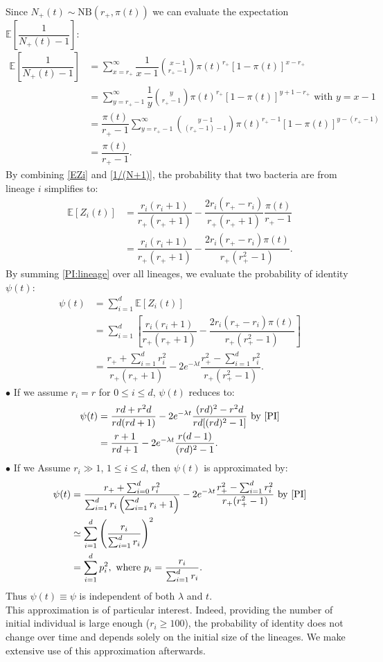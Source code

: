 \documentclass{article}
\begin{document}
Since $N_+(t) \sim \mathrm{NB} (r_+, \pi(t))$ we can evaluate the expectation $\mathbb{E}\left[\dfrac{1}{N_+(t)-1} \right]$:
\begin{align}
\mathbb{E}\left[\dfrac{1}{N_+(t)-1} \right] &= \sum_{x=r_+}^{\infty } \dfrac{1}{x-1} \binom{x-1}{r_+-1} \pi(t)^{r_+} [1-\pi(t)]^{x-r_+} \\
 &=\sum_{y=r_+-1}^{\infty} \dfrac{1}{y} \binom{y}{r_+-1} \pi(t)^{r_+} [1-\pi(t)]^{y+1-r_+} \text{ with }y=x-1\\
 &=\dfrac{\pi(t)}{r_+-1}\sum_{y=r_+-1}^{\infty}\binom{y-1}{(r_+-1)-1} \pi(t)^{r_+-1} [1-\pi(t)]^{y-(r_+-1)} \\ 
 &=\dfrac{\pi(t)}{r_+-1}.\label{1/(N+1)}
\end{align}
By combining \eqref{EZi} and \eqref{1/(N+1)}, the probability that two bacteria are from lineage $i$ simplifies to:
\begin{align}
\mathbb{E}\left[ Z_i(t) \right] &= \dfrac{r_i(r_i+1)}{r_+ (r_+ +1 )}-\dfrac{2 r_i (r_+ -r_{i})}{r_+ (r_+ +1 )}\dfrac{\pi(t)}{r_+-1}\\
 &=\dfrac{r_i(r_i+1)}{r_+ (r_+ +1 )}-\dfrac{2 r_i (r_+ -r_{i})\pi(t)}{r_+ (r_+^2 -1 )}. \label{PI:lineage}
\end{align}
By summing \eqref{PI:lineage} over all lineages, we evaluate the probability of identity $\psi(t)$:
\begin{align}
\psi(t) &= \displaystyle \sum_{i=1}^d \mathbb{E}\left[ Z_i(t) \right]\\
&= \displaystyle \sum_{i=1}^d \left[ \dfrac{r_i(r_i+1)}{r_+ (r_+ +1 )}-\dfrac{2 r_i (r_+ -r_{i})\pi(t)}{r_+ (r_+^2 -1 )} \right] \\
&=    \dfrac{ r_+ + \sum_{i=1}^d r_i^2}{r_+ (r_+ +1)}  -2 e^{-\lambda t} \dfrac{ r_+^2-\sum_{i=1}^d r_i^2}{r_+ (r_+^2 -1) }. \label{PI}
\end{align}
$\bullet$ If we assume $r_i=r$ for $0 \leq i \leq d$, $\psi(t)$ reduces to:
\begin{align}
\psi(t) &= \dfrac{ rd + r^2 d}{rd (rd +1)}  -2 e^{-\lambda t} \dfrac{ (rd)^2-r^2d}{rd [(rd)^2 -1] }  \text{ by } \eqref{PI} \\ 
 &= \dfrac{r+1}{rd+1}  -2e^{-\lambda t} \dfrac{r(d-1)}{(rd)^2 -1 }.
\end{align}
$\bullet$ If we Assume $r_i \gg 1$, $ 1 \leq i \leq d $, then $\psi(t)$ is approximated by:
 \begin{align}
\psi(t) &= \dfrac{ r_+ + \sum_{i=0}^d r_i^2}{\sum_{i=1}^d r_i \left(\sum_{i=1}^d r_i +1\right) }  -2 e^{-\lambda t} \dfrac{ r_+^2-\sum_{i=1}^d r_i^2}{r_+ (r_+^2 -1) } \text{ by } \eqref{PI} \\
 & \simeq \displaystyle \sum_{i=1}^d \left( \dfrac{ r_i}{\sum_{i=1}^d r_i} \right)^2 \\
 &= \displaystyle \sum_{i=1}^d p_i^2,\text{ where } p_i=\dfrac{ r_i}{\sum_{i=1}^d r_i}. \label{simplify:relatedness}
 \end{align}
 Thus $\psi(t) \equiv \psi$ is independent of both $\lambda$ and $t$. \\
 This approximation is of particular interest. Indeed, providing the number of initial individual is large enough ($r_i \geq 100$), the probability of identity does not change over time and depends solely on the initial size of the lineages. We make extensive use of this approximation afterwards.
\end{document}
